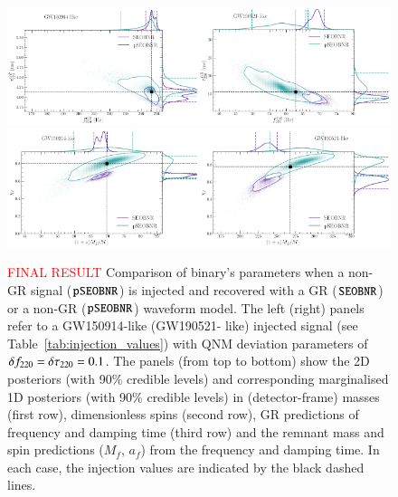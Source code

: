 \begin{figure}
        \includegraphics[width=0.5\textwidth]{figures/GW150914_simulated_signal_0p1_gr_ngr_fgrtaugr.png}\includegraphics[width=0.5\textwidth]{figures/GW190521_simulated_signal_0p1_gr_ngr_fgrtaugr.png}
        \includegraphics[width=0.5\textwidth]{figures/GW150914_simulated_signal_0p1_gr_ngr_Mfaf.png}\includegraphics[width=0.5\textwidth]{figures/GW190521_simulated_signal_0p1_gr_ngr_Mfaf.png}
        \caption{\textcolor{red}{FINAL RESULT} Comparison of binary's parameters when a non-GR signal ($\texttt{pSEOBNR}$) is injected and recovered with a GR ($\texttt{SEOBNR}$) or a non-GR ($\texttt{pSEOBNR}$) waveform model. The left (right) panels refer to
a GW150914-like (GW190521- like) injected signal (see Table~\ref{tab:injection_values}) with QNM deviation parameters of $\delta f_{\text{220}} = \delta \tau_{\text{220}} = 0.1$. The panels (from top to bottom) show the 2D posteriors (with 90\% credible levels) and corresponding marginalised 1D posteriors (with 90\% credible levels) in (detector-frame) masses (first row), dimensionless spins (second row), GR predictions of frequency and damping time (third row) and the remnant mass and spin predictions ($M_f$, $a_f$) from the frequency and damping time. In each case, the injection values are indicated by the black dashed lines.}
        \label{fig:gr_ngr_comparison}
\end{figure}
\fi



